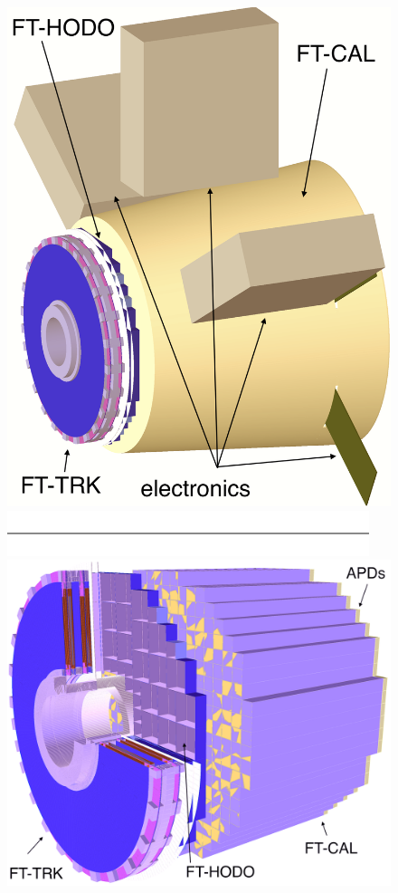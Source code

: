 \begin{figure}
	\centering
	\includegraphics[width=0.99\columnwidth,keepaspectratio]{img/ftGeometry.png}
	\includegraphics[width=0.99\columnwidth,keepaspectratio]{img/blank.png}
	\includegraphics[width=0.99\columnwidth,keepaspectratio]{img/ftDetails.png}

\end{figure}
